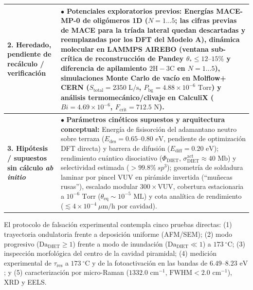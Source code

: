 \documentclass[10pt,twocolumn,a4paper]{article}
\begin{document}
\begin{table}[t]
{\begin{tabular}{@{}p{4.2cm}p{12.8cm}@{}}
\textbf{2. Heredado, pendiente de recálculo / verificación} &
$\bullet$ \textbf{Potenciales exploratorios previos:} Energías MACE-MP-0 de oligómeros 1D ($N=1\dots5$; las cifras previas de MACE para la tríada lateral quedan descartadas y reemplazadas por los DFT del Modelo A), dinámica molecular en LAMMPS AIREBO (ventana sub-crítica de reconstrucción de Pandey $\theta_* \le 12\text{--}15\%$ y diferencia de apilamiento $2\text{H}-3\text{C}$ en $N=1\dots5$), simulaciones Monte Carlo de vacío en Molflow+ CERN ($S_{\text{total}} = 2350\text{ L/s}$, $P_{\text{bg}} = 4.88 \times 10^{-6}\text{ Torr}$) y análisis termomecánico/clivaje en CalculiX ($Bi = 4.69 \times 10^{-6}$, $F_{\text{crit}} = 712.5\text{ N}$). \\ \midrule
\textbf{3. Hipótesis / supuestos sin cálculo \textit{ab initio}} &
$\bullet$ \textbf{Parámetros cinéticos supuestos y arquitectura conceptual:} Energía de fisisorción del adamantano neutro sobre terraza ($E_{\text{des}} = 0.65\text{--}0.80\text{ eV}$, pendiente de optimización DFT directa) y barrera de difusión ($E_{\text{diff}} = 0.20\text{ eV}$); rendimiento cuántico disociativo ($\Phi_{\text{DIET}}$, $\sigma_{\text{DIET}}^{\text{act}} \approx 40\text{ Mb}$) y selectividad estimada ($>99.8\%\ sp^3$); geometría de soldadura laminar por pincel VUV en pirámide invertida (``muñecas rusas''), escalado modular $300 \times \text{VUV}$, cobertura estacionaria a $10^{-6}\text{ Torr}$ ($\theta_{\text{eq}} \sim 10^{-5}\text{ ML}$) y cota analítica de rendimiento ($\lesssim 4 \times 10^{-4}\ \mu\text{m/h}$ por cavidad). \\ \bottomrule
\end{tabular}%
}
\end{table}

El protocolo de falsación experimental contempla cinco pruebas directas: (1) trayectoria ondulatoria frente a deposición uniforme (AFM/SEM); (2) modo progresivo ($\text{Da}_{\text{DIET}} \ge 1$) frente a modo de inundación ($\text{Da}_{\text{DIET}} \ll 1$) a $173\ ^\circ\text{C}$; (3) inspección morfológica del centro de la cavidad piramidal; (4) medición experimental de $\tau_{\text{res}}$ a $173\ ^\circ\text{C}$ y de la fotoactivación en las bandas de $6.49\text{--}8.23\text{ eV}$; y (5) caracterización por micro-Raman ($1332.0\text{ cm}^{-1}$, $\text{FWHM} < 2.0\text{ cm}^{-1}$), XRD y EELS.

\end{document}

